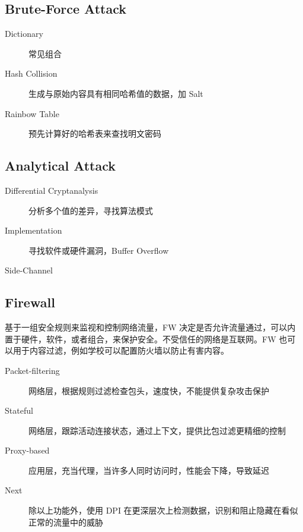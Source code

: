 \documentclass[11pt,journal,compsoc]{IEEEtran}
\begin{document}
\subsection{Brute-Force Attack}

\begin{description}
    \item[Dictionary] 常见组合

    \item[Hash Collision] 生成与原始内容具有相同哈希值的数据，加 Salt

    \item[Rainbow Table] 预先计算好的哈希表来查找明文密码
\end{description}


\subsection{Analytical Attack}

\begin{description}
    \item[Differential Cryptanalysis] 分析多个值的差异，寻找算法模式

    \item[Implementation] 寻找软件或硬件漏洞，Buffer Overflow

    \item[Side-Channel]
\end{description}


\subsection{Firewall}

基于一组安全规则来监视和控制网络流量，FW 决定是否允许流量通过，可以内置于硬件，软件，或者组合，来保护安全。不受信任的网络是互联网。FW 也可以用于内容过滤，例如学校可以配置防火墙以防止有害内容。


\begin{description}
    \item[Packet-filtering] 网络层，根据规则过滤检查包头，速度快，不能提供复杂攻击保护

    \item[Stateful] 网络层，跟踪活动连接状态，通过上下文，提供比包过滤更精细的控制
    
    \item[Proxy-based] 应用层，充当代理，当许多人同时访问时，性能会下降，导致延迟

    \item[Next] 除以上功能外，使用 DPI 在更深层次上检测数据，识别和阻止隐藏在看似正常的流量中的威胁
\end{description}
\end{document}
